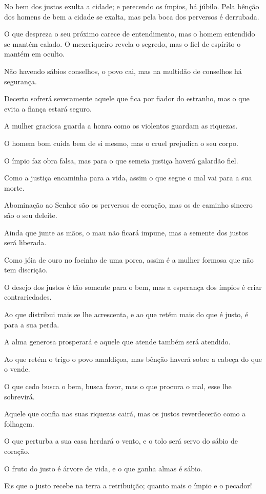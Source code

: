 No bem dos justos exulta a cidade; e perecendo os ímpios, há
júbilo. Pela bênção dos homens de bem a cidade se exalta, mas
pela boca dos perversos é derrubada.

O que despreza o seu próximo carece de entendimento, mas o homem
entendido se mantém calado. O mexeriqueiro revela o segredo,
mas o fiel de espírito o mantém em oculto.

Não havendo sábios conselhos, o povo cai, mas na multidão de
conselhos há segurança.

Decerto sofrerá severamente aquele que fica por fiador do
estranho, mas o que evita a fiança estará seguro.

A mulher graciosa guarda a honra como os violentos guardam as
riquezas.

O homem bom cuida bem de si mesmo, mas o cruel prejudica o seu
corpo.

O ímpio faz obra falsa, mas para o que semeia justiça haverá
galardão fiel.

Como a justiça encaminha para a vida, assim o que segue o mal vai
para a sua morte.

Abominação ao Senhor são os perversos de coração, mas os de
caminho sincero são o seu deleite.

Ainda que junte as mãos, o mau não ficará impune, mas a semente
dos justos será liberada.

Como jóia de ouro no focinho de uma porca, assim é a mulher
formosa que não tem discrição.

O desejo dos justos é tão somente para o bem, mas a esperança dos
ímpios é criar contrariedades.

Ao que distribui mais se lhe acrescenta, e ao que retém mais do
que é justo, é para a sua perda.

A alma generosa prosperará e aquele que atende também será
atendido.

Ao que retém o trigo o povo amaldiçoa, mas bênção haverá sobre a
cabeça do que o vende.

O que cedo busca o bem, busca favor, mas o que procura o mal,
esse lhe sobrevirá.

Aquele que confia nas suas riquezas cairá, mas os justos
reverdecerão como a folhagem.

O que perturba a sua casa herdará o vento, e o tolo será servo do
sábio de coração.

O fruto do justo é árvore de vida, e o que ganha almas é sábio.

Eis que o justo recebe na terra a retribuição; quanto mais o
ímpio e o pecador!

